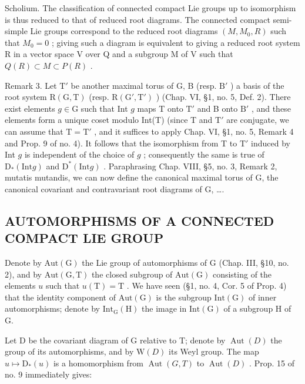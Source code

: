 Scholium. The classification of connected compact Lie groups up to isomorphism is thus reduced to that of reduced root diagrams. The connected compact semi-simple Lie groups correspond to the reduced root diagrams \((M, M_{0}, R)\) such that \(M_{0} = 0\) ; giving such a diagram is equivalent to giving a reduced root system R in a vector space V over Q and a subgroup M of V such that \(Q(R) \subset M \subset P(R)\) .

Remark 3. Let \(\mathrm{T}'\) be another maximal torus of G, B (resp. \(\mathrm{B}'\) ) a basis of the root system \(\mathrm{R}(\mathrm{G},\mathrm{T})\) (resp. \(\mathrm{R}(\mathrm{G}',\mathrm{T}')\) ) (Chap. VI, §1, no. 5, Def. 2). There exist elements \(g\in \mathrm{G}\) such that Int \(g\) maps T onto \(\mathrm{T}'\) and B onto \(\mathrm{B}'\) , and these elements form a unique coset modulo Int(T) (since T and \(\mathrm{T}'\) are conjugate, we can assume that \(\mathrm{T} = \mathrm{T}'\) , and it suffices to apply Chap. VI, §1, no. 5, Remark 4 and Prop. 9 of no. 4). It follows that the isomorphism from T to \(\mathrm{T}'\) induced by Int \(g\) is independent of the choice of \(g\) ; consequently the same is true of \(\mathrm{D}_{*}(\mathrm{Int}g)\) and \(\mathrm{D}^{*}(\mathrm{Int}g)\) . Paraphrasing Chap. VIII, §5, no. 3, Remark 2, mutatis mutandis, we can now define the canonical maximal torus of G, the canonical covariant and contravariant root diagrams of G, \ldots.

\subsection{AUTOMORPHISMS OF A CONNECTED COMPACT LIE GROUP}

Denote by \(\mathrm{Aut}(\mathrm{G})\) the Lie group of automorphisms of G (Chap. III, §10, no. 2), and by \(\mathrm{Aut}(\mathrm{G},\mathrm{T})\) the closed subgroup of \(\mathrm{Aut}(\mathrm{G})\) consisting of the elements \(u\) such that \(u(\mathrm{T}) = \mathrm{T}\) . We have seen (§1, no. 4, Cor. 5 of Prop. 4) that the identity component of \(\mathrm{Aut}(\mathrm{G})\) is the subgroup \(\mathrm{Int}(\mathrm{G})\) of inner automorphisms; denote by \(\mathrm{Int}_{\mathrm{G}}(\mathrm{H})\) the image in \(\mathrm{Int}(\mathrm{G})\) of a subgroup H of G.

Let D be the covariant diagram of G relative to T; denote by \(\operatorname{Aut}(D)\) the group of its automorphisms, and by \(\mathrm{W}(D)\) its Weyl group. The map \(u \mapsto \mathrm{D}_{*}(u)\) is a homomorphism from \(\operatorname{Aut}(G, T)\) to \(\operatorname{Aut}(D)\) . Prop. 15 of no. 9 immediately gives:

